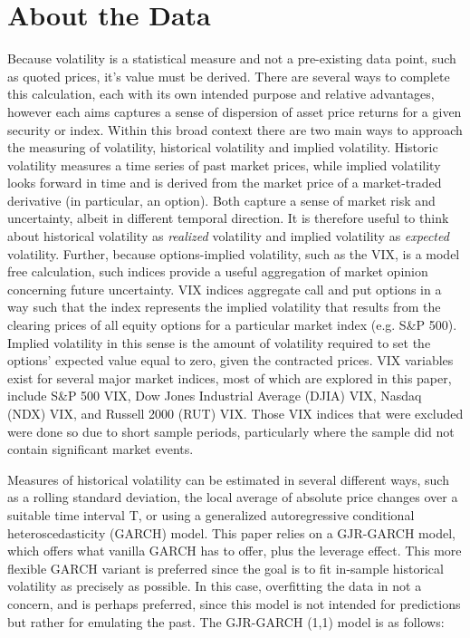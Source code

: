 \documentclass[11pt,a4paper,oldfontcommands]{memoir}
\begin{document}
{%





\section{About the Data}

Because volatility is a statistical measure and not a pre-existing data point, such as quoted prices, it's value must be derived. There are several ways to complete this calculation, each with its own intended purpose and relative advantages, however each aims captures a sense of dispersion of asset price returns for a given security or index. Within this broad context there are two main ways to approach the measuring of volatility, historical volatility and implied volatility. Historic volatility measures a time series of past market prices, while implied volatility looks forward in time and is derived from the market price of a market-traded derivative (in particular, an option). Both capture a sense of market risk and uncertainty, albeit in different temporal direction. It is therefore useful to think about historical volatility as \textit{realized} volatility and implied volatility as \textit{expected} volatility. Further, because options-implied volatility, such as the VIX, is a model free calculation, such indices provide a useful aggregation of market opinion concerning future uncertainty. VIX indices aggregate call and put options in a way such that the index represents the implied volatility that results from the clearing prices of all equity options for a particular market index (e.g. S\&P 500). Implied volatility in this sense is the amount of volatility required to set the options’ expected value equal to zero, given the contracted prices. VIX variables exist for several major market indices, most of which are explored in this paper, include S\&P 500 VIX, Dow Jones Industrial Average (DJIA) VIX, Nasdaq (NDX) VIX, and Russell 2000 (RUT) VIX. Those VIX indices that were excluded were done so due to short sample periods, particularly where the sample did not contain significant market events.

Measures of historical volatility can be estimated in several different ways, such as a rolling standard deviation, the local average of absolute price changes over a suitable time interval T, or using a generalized autoregressive conditional heteroscedasticity (GARCH) model. This paper relies on a GJR-GARCH model, which offers what vanilla GARCH has to offer, plus the leverage effect. This more flexible GARCH variant is preferred since the goal is to fit in-sample historical volatility as precisely as possible. In this case, overfitting the data in not a concern, and is perhaps preferred, since this model is not intended for predictions but rather for emulating the past. The GJR-GARCH (1,1) model is as follows:

}
\end{document}
